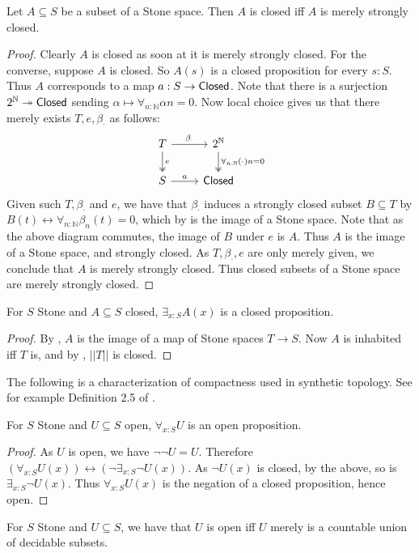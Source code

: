 \begin{lemma}
  Let $A\subseteq S$ be a subset of a Stone space. Then 
    $A$ is closed iff $A$ is merely strongly closed. 
\end{lemma}
\begin{proof}
  Clearly $A$ is closed as soon at it is merely strongly closed. 
  For the converse, suppose $A$ is closed. 
  So $A(s)$ is a closed proposition for every $s:S$. 
  Thus $A$ corresponds to a map $a:S\to \mathsf{Closed}$. 
%
  Note that there is a surjection $2^\mathbb N \twoheadrightarrow \mathsf{Closed}$ sending 
  $\alpha \mapsto \forall_{n:\mathbb N} \alpha n = 0. $
  Now local choice gives us that there merely exists $T, e, \beta_\cdot$ as follows:
  \begin{equation}
    \begin{tikzcd}
      T \arrow[r,"\beta_\cdot"] \arrow[d, two heads,"e"] & 2^\mathbb N 
      \arrow[d,two heads, "\forall_{n:\mathbb N} (\cdot)n = 0"] \\
      S \arrow[r,"a"] & \Closed
    \end{tikzcd} 
  \end{equation} 
  Given such $T,\beta_\cdot $ and $e$, we have that 
  $\beta_\cdot$ induces a strongly closed subset $B\subseteq T$ by 
  $B(t) \leftrightarrow \forall_{n:\mathbb N} \beta_n(t) = 0$, which by 
   is the image of a Stone space. 
  Note that as the above diagram commutes, the image of $B$ under $e$ is $A$.
  Thus $A$ is the image of a Stone space, and strongly closed. 
  As $T,\beta_\cdot, e$ are only merely given, we conclude that $A$ is merely strongly closed. 
  Thus closed subsets of a Stone space are merely strongly closed. 
\end{proof}

\begin{corollary}
  For $S$ Stone and $A\subseteq S$ closed, $\exists_{x:S} A(x)$ is a closed proposition. 
\end{corollary}
\begin{proof}
  By , $A$ is the image of a map of Stone spaces $T\to S$.
  Now $A$ is inhabited iff $T$ is, and by , $||T||$ is closed. 
\end{proof} 
The following is a characterization of compactness used in synthetic topology. 
See for example Definition 2.5 of \cite{SyntheticTopologyLesnik}.
\begin{corollary}
  For $S$ Stone and $U\subseteq S$ open, $\forall_{x:S} U$ is an open proposition. 
\end{corollary}
\begin{proof}
  As $U$ is open, we have $\neg \neg U = U$. 
  Therefore $(\forall_{x:S} U(x)) \leftrightarrow (\neg \exists_{x:S} \neg U(x))$. 
  As $\neg U(x)$ is closed, by the above, so is $\exists_{x:S} \neg U(x)$. 
  Thus $\forall_{x:S} U(x)$ is the negation of a closed proposition, hence open. 
\end{proof}

\begin{corollary}
  For $S$ Stone and $U\subseteq S$, we have that $U$ is open iff $U$ merely is a countable union of decidable subsets. 
\end{corollary}


